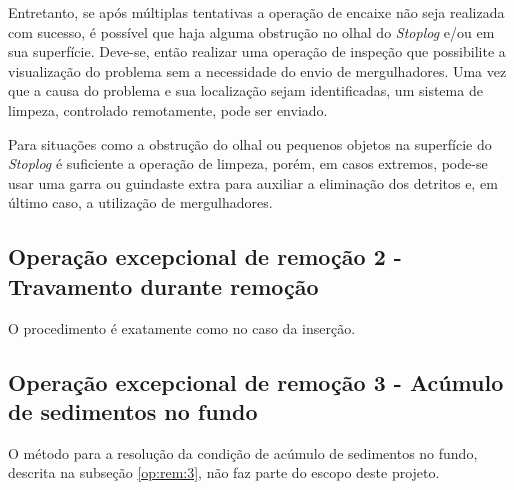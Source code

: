 Entretanto, se após múltiplas tentativas a operação de encaixe não seja
realizada com sucesso, é possível que haja alguma obstrução no olhal do
\emph{Stoplog} e/ou em sua superfície. Deve-se, então realizar uma operação de
inspeção que possibilite a visualização do problema sem a necessidade do envio
de mergulhadores. Uma vez que a causa do problema e sua localização sejam
identificadas, um sistema de limpeza, controlado remotamente, pode ser enviado.

Para situações como a obstrução do olhal ou pequenos objetos na superfície do
\emph{Stoplog} é suficiente a operação de limpeza, porém, em casos extremos,
pode-se usar uma garra ou guindaste extra para auxiliar a eliminação dos
detritos e, em último caso, a utilização de mergulhadores.


\subsection{Operação excepcional de remoção 2 - Travamento durante remoção}
O procedimento é exatamente como no caso da inserção.

\subsection{Operação excepcional de remoção 3 - Acúmulo de sedimentos no fundo}
O método para a resolução da condição de acúmulo de sedimentos no fundo,
descrita na subseção \ref{op:rem:3}, não faz parte do escopo deste projeto.
